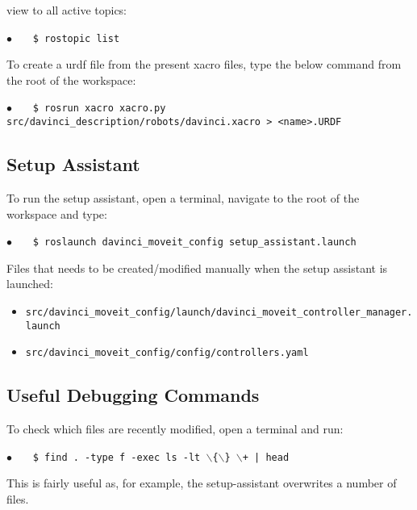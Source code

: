 view to all active topics:

\hspace{1cm} \textbf{$\bullet$} \ \ \  \texttt{\$ rostopic list} \ \ \ {} 

To create a \gls{urdf} file from the present xacro files, type the below command from the root of the workspace:

\hspace{1cm} \textbf{$\bullet$} \ \ \  \texttt{\$ rosrun xacro xacro.py src/davinci\_description/robots/davinci.xacro > <name>.URDF} %
%
\subsection*{Setup Assistant}
To run the setup assistant, open a terminal, navigate to the root of the workspace and type:

\hspace{1cm} \textbf{$\bullet$} \ \ \  \texttt{\$ roslaunch davinci\_moveit\_config setup\_assistant.launch} \ \ \ {} 

Files that needs to be created/modified manually when the setup assistant is launched:
\begin{itemize}
	\item \texttt{src/davinci\_moveit\_config/launch/davinci\_moveit\_controller\_manager.launch}
	\item \texttt{src/davinci\_moveit\_config/config/controllers.yaml}
\end{itemize}

\subsection*{Useful Debugging Commands}
To check which files are recently modified, open a terminal and run:

\hspace{1cm} \textbf{$\bullet$} \ \ \  \texttt{\$ find . -type f -exec ls -lt $\backslash$\{$\backslash$\} $\backslash$+ | head} 

This is fairly useful as, for example, the setup-assistant overwrites a number of files. 

{}{}

